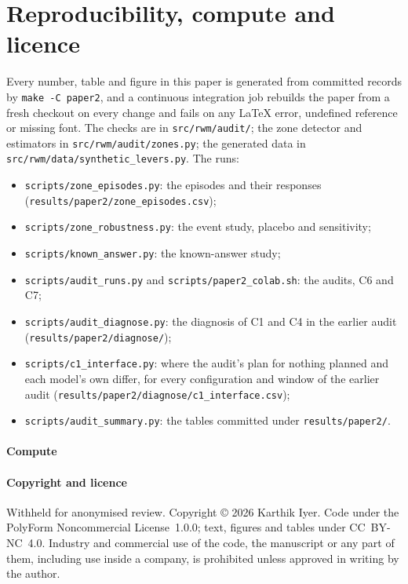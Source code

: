 \section{Reproducibility, compute and licence}
\label{sec:repro}

Every number, table and figure in this paper is generated from committed
records by \texttt{make -C paper2}, and a continuous integration job rebuilds
the paper from a fresh checkout on every change and fails on any LaTeX error,
undefined reference or missing font. The checks are in
\texttt{src/rwm/audit/}; the zone detector and estimators in
\texttt{src/rwm/audit/zones.py}; the generated data in
\texttt{src/rwm/data/synthetic\_levers.py}. The runs:
\begin{itemize}\setlength{\itemsep}{1pt}
\item \nolinkurl{scripts/zone_episodes.py}: the episodes and their responses
(\nolinkurl{results/paper2/zone_episodes.csv});
\item \nolinkurl{scripts/zone_robustness.py}: the event study, placebo and
sensitivity;
\item \nolinkurl{scripts/known_answer.py}: the known-answer study;
\item \nolinkurl{scripts/audit_runs.py} and \nolinkurl{scripts/paper2_colab.sh}:
the audits, C6 and C7;
\item \nolinkurl{scripts/audit_diagnose.py}: the diagnosis of C1 and C4 in the
earlier audit (\nolinkurl{results/paper2/diagnose/});
\item \nolinkurl{scripts/c1_interface.py}: where the audit's plan for nothing
planned and each model's own differ, for every configuration and window of the
earlier audit (\nolinkurl{results/paper2/diagnose/c1_interface.csv});
\item \nolinkurl{scripts/audit_summary.py}: the tables committed under
\nolinkurl{results/paper2/}.
\end{itemize}

\paragraph{Compute}


\paragraph{Copyright and licence}
\iftmlr Withheld for anonymised review.\else
Copyright \copyright{} 2026 Karthik Iyer. Code under the PolyForm Noncommercial
License~1.0.0; text, figures and tables under CC~BY-NC~4.0. Industry and
commercial use of the code, the manuscript or any part of them, including use
inside a company, is prohibited unless approved in writing by the author.\fi


